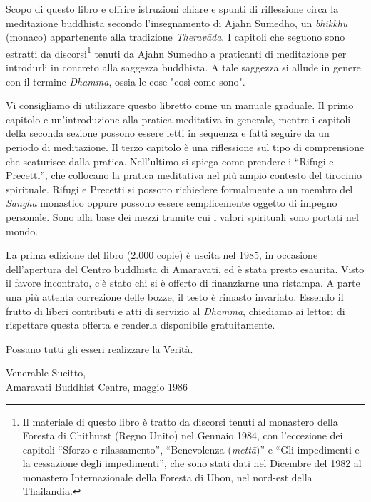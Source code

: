 
Scopo di questo libro e offrire istruzioni chiare e spunti di
riflessione circa la meditazione buddhista secondo l'insegnamento di
Ajahn Sumedho, un \textit{bhikkhu} (monaco) appartenente alla tradizione
\textit{Theravāda}. I capitoli che seguono sono estratti da discorsi\footnote{Il materiale di questo libro è tratto da discorsi tenuti
al monastero della Foresta di Chithurst (Regno Unito) nel Gennaio 1984,
con l'eccezione dei capitoli “Sforzo e rilassamento”, “Benevolenza
(\textit{mettā})” e “Gli impedimenti e la cessazione degli impedimenti”, che sono
stati dati nel Dicembre del 1982 al monastero Internazionale della
Foresta di Ubon, nel nord-est della Thailandia.}
tenuti da Ajahn Sumedho a praticanti di meditazione per introdurli in
concreto alla saggezza buddhista. A tale saggezza si allude in genere
con il termine \textit{Dhamma}, ossia le cose "così come sono".

Vi consigliamo di utilizzare questo libretto come un manuale graduale.
Il primo capitolo e un'introduzione alla pratica meditativa in generale,
mentre i capitoli della seconda sezione possono essere letti in sequenza
e fatti seguire da un periodo di meditazione. Il terzo capitolo è una
riflessione sul tipo di comprensione che scaturisce dalla pratica.
Nell'ultimo si spiega come prendere i “Rifugi e Precetti”, che collocano
la pratica meditativa nel più ampio contesto del tirocinio spirituale.
Rifugi e Precetti si possono richiedere formalmente a un membro del
\textit{Sangha} monastico oppure possono essere semplicemente oggetto di impegno
personale. Sono alla base dei mezzi tramite cui i valori spirituali sono
portati nel mondo.

La prima edizione del libro (2.000 copie) è uscita nel 1985, in
occasione dell'apertura del Centro buddhista di Amaravati, ed è stata
presto esaurita. Visto il favore incontrato, c'è stato chi si è offerto
di finanziarne una ristampa. A parte una più attenta correzione delle
bozze, il testo è rimasto invariato. Essendo il frutto di liberi
contributi e atti di servizio al \textit{Dhamma}, chiediamo ai lettori di
rispettare questa offerta e renderla disponibile gratuitamente.

Possano tutti gli esseri realizzare la Verità.

\bigskip
{\par\raggedleft
Venerable Sucitto,\\
Amaravati Buddhist Centre, maggio 1986\\
\par}

